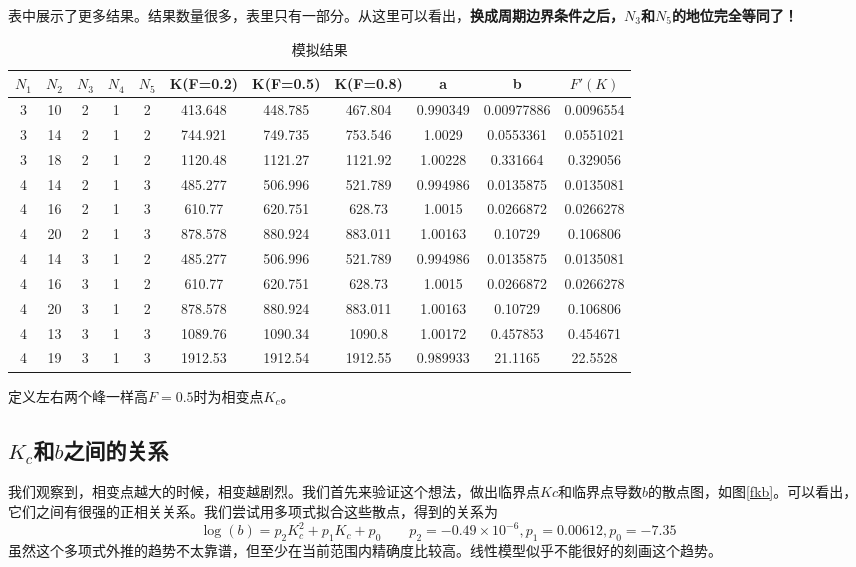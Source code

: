 \documentclass[12pt,a4paper]{article}
\begin{document}
表中展示了更多结果。结果数量很多，表里只有一部分。从这里可以看出，\textbf{换成周期边界条件之后，$N_3$和$N_5$的地位完全等同了！}
\begin{table}[h]
\centering
\begin{tabular}{ccccccccccc}
\hline
$N_1$ & $N_2$ & $N_3$ & $N_4$ & $N_5$ & K(F=0.2) & K(F=0.5) & K(F=0.8) & a & b & $F'(K)$ \\
\hline
3 & 10 & 2 & 1 & 2 & 413.648 & 448.785 & 467.804 & 0.990349 & 0.00977886 & 0.0096554 \\
3 & 14 & 2 & 1 & 2 & 744.921 & 749.735 & 753.546 & 1.0029 & 0.0553361 & 0.0551021 \\
3 & 18 & 2 & 1 & 2 & 1120.48 & 1121.27 & 1121.92 & 1.00228 & 0.331664 & 0.329056 \\
4 & 14 & 2 & 1 & 3 & 485.277 & 506.996 & 521.789 & 0.994986 & 0.0135875 & 0.0135081 \\
4 & 16 & 2 & 1 & 3 & 610.77 & 620.751 & 628.73 & 1.0015 & 0.0266872 & 0.0266278 \\
4 & 20 & 2 & 1 & 3 & 878.578 & 880.924 & 883.011 & 1.00163 & 0.10729 & 0.106806 \\
4 & 14 & 3 & 1 & 2 & 485.277 & 506.996 & 521.789 & 0.994986 & 0.0135875 & 0.0135081 \\
4 & 16 & 3 & 1 & 2 & 610.77 & 620.751 & 628.73 & 1.0015 & 0.0266872 & 0.0266278 \\
4 & 20 & 3 & 1 & 2 & 878.578 & 880.924 & 883.011 & 1.00163 & 0.10729 & 0.106806 \\
4 & 13 & 3 & 1 & 3 & 1089.76 & 1090.34 & 1090.8 & 1.00172 & 0.457853 & 0.454671 \\
4 & 19 & 3 & 1 & 3 & 1912.53 & 1912.54 & 1912.55 & 0.989933 & 21.1165 & 22.5528 \\
\hline
\end{tabular}
\caption{模拟结果}
\label{t1}
\end{table}

定义左右两个峰一样高$F=0.5$时为相变点$K_c$。

\subsection{$K_c$和$b$之间的关系}

我们观察到，相变点越大的时候，相变越剧烈。我们首先来验证这个想法，做出临界点$Kc$和临界点导数$b$的散点图，如图\ref{fkb}。可以看出，它们之间有很强的正相关关系。我们尝试用多项式拟合这些散点，得到的关系为
$$ \log(b) = p_2 K_c^2 + p_1 K_c + p_0 \qquad p_2 = -0.49 \times 10^{-6}, p_1 =  0.00612, p_0 = -7.35 $$
虽然这个多项式外推的趋势不太靠谱，但至少在当前范围内精确度比较高。线性模型似乎不能很好的刻画这个趋势。
\end{document}
